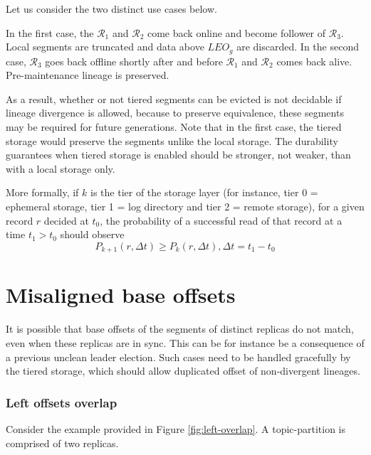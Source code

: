 \documentclass{article}
\begin{document}
Let us consider the two distinct use cases below.

\begin{outline}[enumerate]
	\1 In the first case, the $\mathcal{R}_1$ and $\mathcal{R}_2$ come back online and become follower of $\mathcal{R}_3$. Local segments are truncated and data above $LEO_g$ are discarded.
	\1 In the second case,  $\mathcal{R}_3$ goes back offline shortly after and before $\mathcal{R}_1$ and $\mathcal{R}_2$ comes back alive. Pre-maintenance lineage is preserved.  
\end{outline}

As a result, whether or not tiered segments can be evicted is not decidable if lineage divergence is allowed, because to preserve equivalence, these segments may be required for future generations.
Note that in the first case, the tiered storage would preserve the segments unlike the local storage. The durability guarantees when tiered storage is enabled should be stronger, not weaker, than with a local storage only.

More formally, if $k$ is the tier of the storage layer (for instance, tier 0 = ephemeral storage, tier 1 = log directory and tier 2 = remote storage), for a given record $r$ decided at $t_0$, the probability of a successful read of that record at a time $t_1 > t_0$ should observe
\[
P_{k+1}(r, \Delta t) \geq P_{k}(r, \Delta t), \Delta t = t_1 - t_0
\] 

\section{Misaligned base offsets}

It is possible that base offsets of the segments of distinct replicas do not match, even when these replicas are in sync. This can be for instance be a consequence of a previous unclean leader election. Such cases need to be handled gracefully by the tiered storage, which should allow duplicated offset of non-divergent lineages.

\subsubsection{Left offsets overlap}

Consider the example provided in Figure \ref{fig:left-overlap}. A topic-partition is comprised of two replicas. 
\end{document}
